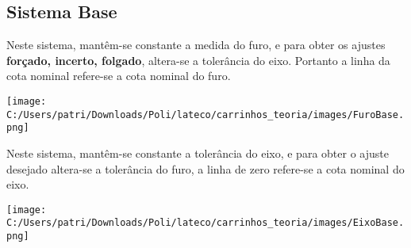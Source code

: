 \subsection{Sistema Base}

\begin{namedtheorem}
Neste sistema, mantêm-se constante a medida do furo, e para obter os ajustes \textbf{forçado, incerto, folgado}, altera-se a tolerância do eixo. Portanto a linha da cota nominal refere-se a cota nominal do furo.

\texttt{[image: C:/Users/patri/Downloads/Poli/lateco/carrinhos\_teoria/images/FuroBase.png]}
\end{namedtheorem}

\begin{namedtheorem}
Neste sistema, mantêm-se constante a tolerância do eixo, e para obter o ajuste desejado altera-se a tolerância do furo, a linha de zero refere-se a cota nominal do eixo.

\texttt{[image: C:/Users/patri/Downloads/Poli/lateco/carrinhos\_teoria/images/EixoBase.png]}
\end{namedtheorem}